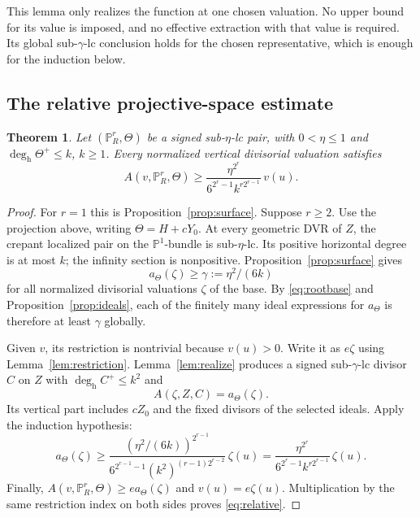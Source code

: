 \documentclass[11pt,reqno]{amsart}
\numberwithin{equation}{section}
\newtheorem{theorem}{Theorem}[section]
\theoremstyle{definition}
\theoremstyle{remark}
\newcommand{\PP}{\mathbb P}
\newcommand{\degh}{\deg_{\mathrm h}}
\begin{document}
This lemma only realizes the function at one chosen valuation. No upper bound for its value is imposed, and no effective extraction with that value is required. Its global sub-$\gamma$-lc conclusion holds for the chosen representative, which is enough for the induction below.

\subsection{The relative projective-space estimate}
\begin{theorem}\label{thm:relative}
Let $(\PP^r_R,\Theta)$ be a signed sub-$\eta$-lc pair, with $0<\eta\le1$ and $\degh\Theta^+\le k$, $k\ge1$. Every normalized vertical divisorial valuation satisfies
\begin{equation}\label{eq:relative}
 A(v,\PP^r_R,\Theta)\ge
 \frac{\eta^{2^r}}{6^{2^r-1}k^{r2^{r-1}}}\,v(u).
\end{equation}
\end{theorem}
\begin{proof}
For $r=1$ this is Proposition~\ref{prop:surface}. Suppose $r\ge2$. Use the projection above, writing $\Theta=H+cY_0$. At every geometric DVR of $Z$, the crepant localized pair on the $\PP^1$-bundle is sub-$\eta$-lc. Its positive horizontal degree is at most $k$; the infinity section is nonpositive. Proposition~\ref{prop:surface} gives
\[
 a_\Theta(\zeta)\ge\gamma:=\eta^2/(6k)
\]
for all normalized divisorial valuations $\zeta$ of the base. By \eqref{eq:rootbase} and Proposition~\ref{prop:ideals}, each of the finitely many ideal expressions for $a_\Theta$ is therefore at least $\gamma$ globally.

Given $v$, its restriction is nontrivial because $v(u)>0$. Write it as $e\zeta$ using Lemma~\ref{lem:restriction}. Lemma~\ref{lem:realize} produces a signed sub-$\gamma$-lc divisor $C$ on $Z$ with $\degh C^+\le k^2$ and
\[
 A(\zeta,Z,C)=a_\Theta(\zeta).
\]
Its vertical part includes $cZ_0$ and the fixed divisors of the selected ideals. Apply the induction hypothesis:
\[
 a_\Theta(\zeta)\ge
 \frac{(\eta^2/(6k))^{2^{r-1}}}
 {6^{2^{r-1}-1}(k^2)^{(r-1)2^{r-2}}}\,\zeta(u)
 =\frac{\eta^{2^r}}{6^{2^r-1}k^{r2^{r-1}}}\,\zeta(u).
\]
Finally, $A(v,\PP^r_R,\Theta)\ge e a_\Theta(\zeta)$ and $v(u)=e\zeta(u)$. Multiplication by the same restriction index on both sides proves \eqref{eq:relative}.
\end{proof}
\end{document}
